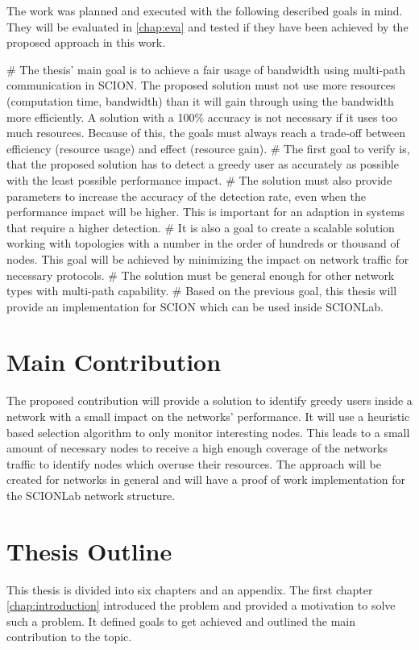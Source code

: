 \documentclass[thesis.tex]{subfiles}
\begin{document}
The work was planned and executed with the following described goals in mind. They will be evaluated in \autoref{chap:eva} and tested if they have been achieved by the proposed approach in this work.
     \begin{easylist}
        \MyNumberedListProperties
        # The thesis' main goal is to achieve a fair usage of bandwidth using multi-path communication in SCION. The proposed solution must not use more resources (computation time, bandwidth) than it will gain through using the bandwidth more efficiently. A solution with a 100\% accuracy is not necessary if it uses too much resources. Because of this, the goals must always reach a trade-off between efficiency (resource usage) and effect (resource gain).        
        # The first goal to verify is, that the proposed solution has to detect a greedy user as accurately as possible with the least possible performance impact.
        # The solution must also provide parameters to increase the accuracy of the detection rate, even when the performance impact will be higher. This is important for an adaption in systems that require a higher detection.
        # It is also a goal to create a scalable solution working with topologies with a number in the order of hundreds or thousand of nodes. This goal will be achieved by minimizing the impact on network traffic for necessary protocols.
        # The solution must be general enough for other network types with multi-path capability.        
        # Based on the previous goal, this thesis will provide an implementation for SCION which can be used inside SCIONLab.
    \end{easylist}

\section{Main Contribution}
The proposed contribution will provide a solution to identify greedy users inside a network with a small impact on the networks' performance. It will use a heuristic based selection algorithm to only monitor interesting nodes. This leads to a small amount of necessary nodes to receive a high enough coverage of the networks traffic to identify nodes which overuse their resources. The approach will be created for networks in general and will have a proof of work implementation for the SCIONLab network structure.

\section{Thesis Outline}
This thesis is divided into six chapters and an appendix. The first chapter \autoref{chap:introduction} introduced the problem and provided a motivation to solve such a problem. It defined goals to get achieved and outlined the main contribution to the topic.
\end{document}
